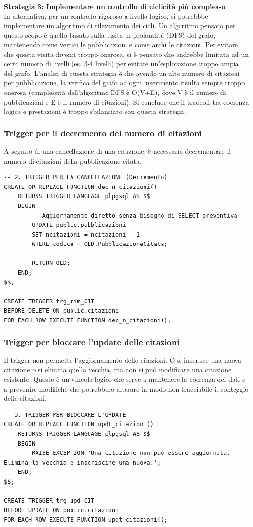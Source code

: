\documentclass[a4paper,12pt]{article}
\begin{document}
\\ \textbf{Strategia 3: Implementare un controllo di ciclicità più complesso}
\\ In alternativa, per un controllo rigoroso a livello logico, si potrebbbe implementare un algoritmo di rilevamento dei cicli. Un algoritmo pensato per questo scopo è quello basato sulla visita in profondità (DFS) del grafo, mantenendo come vertici le pubblicazioni e come archi le citazioni. Per evitare che questa visita diventi troppo onerosa, si è pensato che andrebbe limitata ad un certo numero di livelli (es. 3-4 livelli) per evitare un'esplorazione troppo ampia del grafo. L'analisi di questa strategia è che avendo un alto numero di citazioni per pubblicazione, la verifica del grafo ad ogni inserimento risulta sempre troppo onerosa (complessità dell'algoritmo DFS è O(V+E), dove V è il numero di pubblicazioni e E è il numero di citazioni). Si conclude che il tradeoff tra coerenza logica e prestazioni è troppo sbilanciato con questa strategia.

\subsubsection{Trigger per il decremento del numero di citazioni}
A seguito di una cancellazione di una citazione, è necessario decrementare il numero di citazioni della pubblicazione citata. 
\begin{lstlisting}
-- 2. TRIGGER PER LA CANCELLAZIONE (Decremento)
CREATE OR REPLACE FUNCTION dec_n_citazioni()
    RETURNS TRIGGER LANGUAGE plpgsql AS $$
    BEGIN
        -- Aggiornamento diretto senza bisogno di SELECT preventiva
        UPDATE public.pubblicazioni
        SET ncitazioni = ncitazioni - 1
        WHERE codice = OLD.PubblicazioneCitata;
        
        RETURN OLD;
    END;
$$;

CREATE TRIGGER trg_rim_CIT
BEFORE DELETE ON public.citazioni
FOR EACH ROW EXECUTE FUNCTION dec_n_citazioni();

\end{lstlisting}

\subsubsection{Trigger per bloccare l'update delle citazioni}
Il trigger non permette l'aggiornamento delle citazioni. O si inserisce una nuova citazione o si elimina quella vecchia, ma non si può modificare una citazione esistente. Questo è un vincolo logico che serve a mantenere la coerenza dei dati e a prevenire modifiche che potrebbero alterare in modo non tracciabile il conteggio delle citazioni.
\begin{lstlisting}
-- 3. TRIGGER PER BLOCCARE L'UPDATE
CREATE OR REPLACE FUNCTION updt_citazioni()
    RETURNS TRIGGER LANGUAGE plpgsql AS $$
    BEGIN
        RAISE EXCEPTION 'Una citazione non può essere aggiornata. Elimina la vecchia e inseriscine una nuova.';
    END;
$$;

CREATE TRIGGER trg_upd_CIT
BEFORE UPDATE ON public.citazioni
FOR EACH ROW EXECUTE FUNCTION updt_citazioni();

\end{lstlisting}
\end{document}
